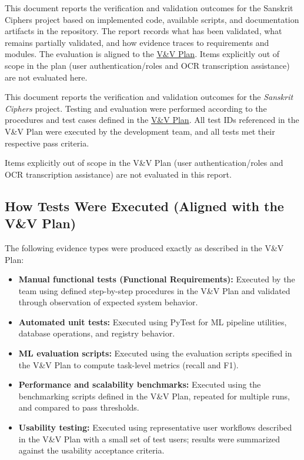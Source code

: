 \documentclass[12pt, titlepage]{article}
\begin{document}
This document reports the verification and validation outcomes for the Sanskrit Ciphers project based on implemented code, available scripts, and documentation artifacts in the repository. The report records what has been validated, what remains partially validated, and how evidence traces to requirements and modules. The evaluation is aligned to the \href{https://github.com/DylanG5/sanskrit-cipher/blob/main/docs/VnVPlan/VnVPlan.pdf}{V\&V Plan}. Items explicitly out of scope in the plan (user authentication/roles and OCR transcription assistance) are not evaluated here.

This document reports the verification and validation outcomes for the \textit{Sanskrit Ciphers} project. Testing and evaluation were performed according to the procedures and test cases defined in the \href{https://github.com/DylanG5/sanskrit-cipher/blob/main/docs/VnVPlan/VnVPlan.pdf}{V\&V Plan}. All test IDs referenced in the V\&V Plan were executed by the development team, and all tests met their respective pass criteria.

Items explicitly out of scope in the V\&V Plan (user authentication/roles and OCR transcription assistance) are not evaluated in this report.

\subsection{How Tests Were Executed (Aligned with the V\&V Plan)}
The following evidence types were produced exactly as described in the V\&V Plan:
\begin{itemize}
  \item \textbf{Manual functional tests (Functional Requirements):} Executed by the team using defined step-by-step procedures in the V\&V Plan and validated through observation of expected system behavior.
  \item \textbf{Automated unit tests:} Executed using PyTest for ML pipeline utilities, database operations, and registry behavior.
  \item \textbf{ML evaluation scripts:} Executed using the evaluation scripts specified in the V\&V Plan to compute task-level metrics (recall and F1).
  \item \textbf{Performance and scalability benchmarks:} Executed using the benchmarking scripts defined in the V\&V Plan, repeated for multiple runs, and compared to pass thresholds.
  \item \textbf{Usability testing:} Executed using representative user workflows described in the V\&V Plan with a small set of test users; results were summarized against the usability acceptance criteria.
\end{itemize}
\end{document}
